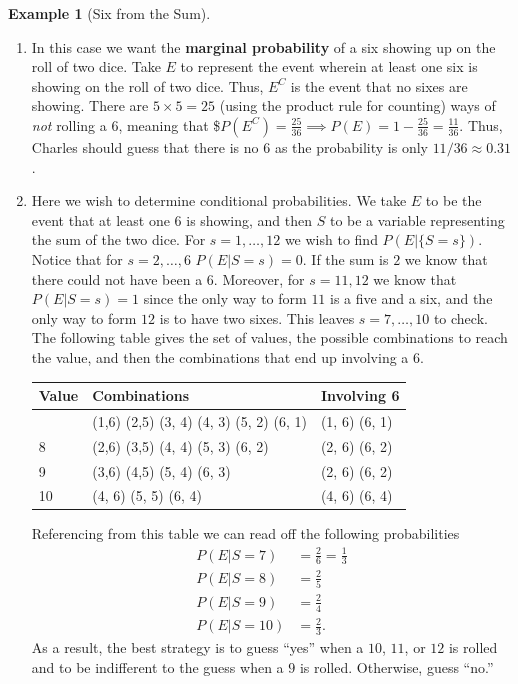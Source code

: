 \documentclass[
  letterpaper,
  DIV=11,
  numbers=noendperiod]{scrreprt}
\theoremstyle{definition}
\theoremstyle{definition}
\theoremstyle{definition}
\newtheorem{example}{Example}[chapter]
\theoremstyle{remark}
\begin{document}
\begin{example}[Six from the
Sum]
\begin{tcolorbox}[enhanced jigsaw, colback=white, breakable, rightrule=.15mm, leftrule=.75mm, toprule=.15mm, left=2mm, arc=.35mm, opacityback=0, bottomrule=.15mm]
\begin{enumerate}
\def\labelenumi{\alph{enumi}.}
\item
  In this case we want the \textbf{marginal probability} of a six
  showing up on the roll of two dice. Take \(E\) to represent the event
  wherein at least one six is showing on the roll of two dice. Thus,
  \(E^C\) is the event that no sixes are showing. There are
  \(5\times 5=25\) (using the product rule for counting) ways of
  \emph{not} rolling a \(6\), meaning that
  \$\(P(E^C) = \frac{25}{36} \implies P(E) = 1 - \frac{25}{36} = \frac{11}{36}\).
  Thus, Charles should guess that there is no \(6\) as the probability
  is only \(11/36 \approx 0.31\).
\item
  Here we wish to determine conditional probabilities. We take \(E\) to
  be the event that at least one \(6\) is showing, and then \(S\) to be
  a variable representing the sum of the two dice. For
  \(s= 1, \dots, 12\) we wish to find \(P(E|\{S=s\})\). Notice that for
  \(s=2,\dots,6\) \(P(E|S=s) = 0\). If the sum is \(2\) we know that
  there could not have been a \(6\). Moreover, for \(s=11,12\) we know
  that \(P(E|S=s) = 1\) since the only way to form \(11\) is a five and
  a six, and the only way to form \(12\) is to have two sixes. This
  leaves \(s = 7,\dots,10\) to check. The following table gives the set
  of values, the possible combinations to reach the value, and then the
  combinations that end up involving a \(6\).

  \begin{longtable}[]{@{}lll@{}}
  \toprule\noalign{}
  Value & Combinations & Involving 6 \\
  \midrule\noalign{}
  \endhead
  \bottomrule\noalign{}
  \endlastfoot
  7 & (1,6) (2,5) (3, 4) (4, 3) (5, 2) (6, 1) & (1, 6) (6, 1) \\
  8 & (2,6) (3,5) (4, 4) (5, 3) (6, 2) & (2, 6) (6, 2) \\
  9 & (3,6) (4,5) (5, 4) (6, 3) & (2, 6) (6, 2) \\
  10 & (4, 6) (5, 5) (6, 4) & (4, 6) (6, 4) \\
  \end{longtable}

  Referencing from this table we can read off the following
  probabilities \begin{align*}
  P(E|S=7) &= \frac{2}{6} = \frac{1}{3}\\
  P(E|S=8) &= \frac{2}{5} \\
  P(E|S=9) &= \frac{2}{4} \\
  P(E|S=10) &= \frac{2}{3}.
  \end{align*} As a result, the best strategy is to guess ``yes'' when a
  \(10\), \(11\), or \(12\) is rolled and to be indifferent to the guess
  when a \(9\) is rolled. Otherwise, guess ``no.''
\end{enumerate}

\end{tcolorbox}

\end{example}
\end{document}
